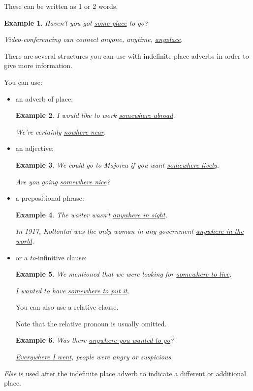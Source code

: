 \documentclass[oneside]{book}
\numberwithin{equation}{section}
\newtheorem{example}{Example}[section]
\begin{document}
These can be written as 1 or 2 words.
\begin{example}
    Haven't you got \underline{some place} to go?
    
    Video-conferencing can connect anyone, anytime, \underline{anyplace}.
\end{example}
%
\noindent{} There are several structures you can use with indefinite place adverbs in order to give more information.

You can use:
\begin{itemize}
    \item an adverb of place:
    \begin{example}
        I would like to work \underline{somewhere abroad}.
        
        We're certainly \underline{nowhere near}.
    \end{example}
    \item an adjective:
    \begin{example}
        We could go to Majorca if you want \underline{somewhere lively}.
        
        Are you going \underline{somewhere nice}?
    \end{example}
    \item a prepositional phrase:
    \begin{example}
        The waiter wasn't \underline{anywhere in sight}.
        
        In 1917, Kollontai was the only woman in any government \underline{anywhere in the world}.
    \end{example}
    \item or a \textit{to}-infinitive clause:
    \begin{example}
        We mentioned that we were looking for \underline{somewhere to live}.
        
        I wanted to have \underline{somewhere to put it}.
    \end{example}
    You can also use a relative clause.
    
    Note that the relative pronoun is usually omitted.
    \begin{example}
        Was there \underline{anywhere you wanted to go}?
        
        \underline{Everywhere I went}, people were angry or suspicious.
    \end{example}
\end{itemize}
%
\noindent{} \textit{Else} is used after the indefinite place adverb to indicate a different or additional place.
\end{document}
